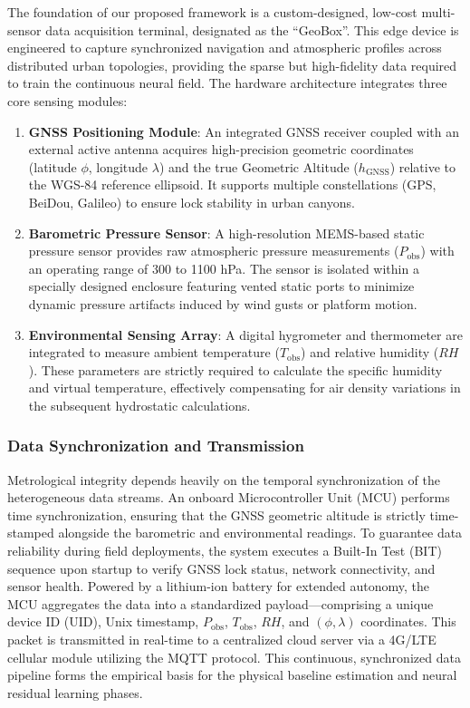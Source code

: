 The foundation of our proposed framework is a custom-designed, low-cost multi-sensor data acquisition terminal, designated as the ``GeoBox''. This edge device is engineered to capture synchronized navigation and atmospheric profiles across distributed urban topologies, providing the sparse but high-fidelity data required to train the continuous neural field. The hardware architecture integrates three core sensing modules:
\begin{enumerate}
    \item \textbf{GNSS Positioning Module}: An integrated GNSS receiver coupled with an external active antenna acquires high-precision geometric coordinates (latitude $\phi$, longitude $\lambda$) and the true Geometric Altitude ($h_\text{GNSS}$) relative to the WGS-84 reference ellipsoid. It supports multiple constellations (GPS, BeiDou, Galileo) to ensure lock stability in urban canyons.
    \item \textbf{Barometric Pressure Sensor}: A high-resolution MEMS-based static pressure sensor provides raw atmospheric pressure measurements ($P_\text{obs}$) with an operating range of 300 to 1100 hPa. The sensor is isolated within a specially designed enclosure featuring vented static ports to minimize dynamic pressure artifacts induced by wind gusts or platform motion.
    \item \textbf{Environmental Sensing Array}: A digital hygrometer and thermometer are integrated to measure ambient temperature ($T_\text{obs}$) and relative humidity ($RH$). These parameters are strictly required to calculate the specific humidity and virtual temperature, effectively compensating for air density variations in the subsequent hydrostatic calculations.
\end{enumerate}

\subsubsection{Data Synchronization and Transmission}
Metrological integrity depends heavily on the temporal synchronization of the heterogeneous data streams. An onboard Microcontroller Unit (MCU) performs time synchronization, ensuring that the GNSS geometric altitude is strictly time-stamped alongside the barometric and environmental readings. To guarantee data reliability during field deployments, the system executes a Built-In Test (BIT) sequence upon startup to verify GNSS lock status, network connectivity, and sensor health. Powered by a lithium-ion battery for extended autonomy, the MCU aggregates the data into a standardized payload—comprising a unique device ID (UID), Unix timestamp, $P_\text{obs}$, $T_\text{obs}$, $RH$, and $(\phi, \lambda)$ coordinates. This packet is transmitted in real-time to a centralized cloud server via a 4G/LTE cellular module utilizing the MQTT protocol. This continuous, synchronized data pipeline forms the empirical basis for the physical baseline estimation and neural residual learning phases.

